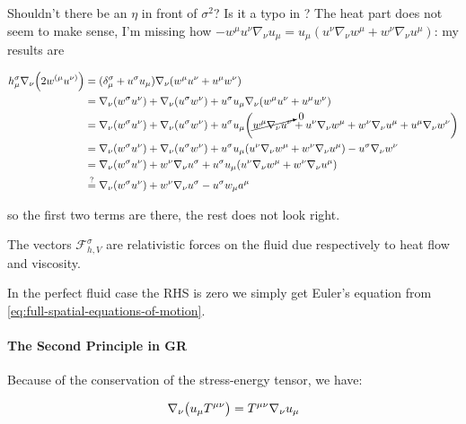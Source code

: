 \documentclass[main.tex]{subfiles}
\begin{document}
\begin{greenbox}
  Shouldn't there be an \(\eta\) in front of \(\sigma^2\)? Is it a typo in \cite[]{Taub:1978}?
  The heat part does not seem to make sense, I'm missing how \(-w^\mu u^\nu \nabla_\nu u_\mu = u_\mu (u^\nu \nabla_\nu w^\mu + w^\nu \nabla_\nu u^\mu)\): my results are

  \begin{subequations}
  \begin{align}
    h^\sigma _\mu \nabla_\nu \qty(2 w^{(\mu} u^{\nu)}) &=  (\delta_\mu ^\sigma + u^\sigma u_\mu) \nabla_\nu \qty(w^\mu u^\nu + u^\mu w^\nu)  \\
    &= \nabla_\nu \qty(w^\sigma u^\nu) + \nabla_\nu (u^\sigma w^\nu)
    + u^\sigma u_\mu \nabla_\nu \qty(w^\mu u^\nu + u^\mu w^\nu)  \\
    &= \nabla_\nu \qty(w^\sigma u^\nu) + \nabla_\nu (u^\sigma w^\nu)
    + u^\sigma u_\mu \qty(\cancelto{0}{ w^\mu \nabla_\nu u^\nu } + u^\nu \nabla_\nu w^\mu + w^\nu \nabla_\nu u^\mu + u^\mu \nabla_\nu w^\nu)  \\
    &= \nabla_\nu \qty(w^\sigma u^\nu) + \nabla_\nu (u^\sigma w^\nu)
    + u^\sigma u_\mu \qty(u^\nu \nabla_\nu w^\mu + w^\nu \nabla_\nu u^\mu) - u^\sigma \nabla_\nu w^\nu  \\
    &= \nabla_\nu \qty(w^\sigma u^\nu) + w^\nu \nabla_\nu u^\sigma
    + u^\sigma u_\mu \qty(u^\nu \nabla_\nu w^\mu + w^\nu \nabla_\nu u^\mu) \\
    &\overset{?}{=} \nabla_\nu \qty(w^\sigma u^\nu) + w^\nu \nabla_\nu u^\sigma
    - u^\sigma w_\mu a^\mu
  \end{align}
  \end{subequations}

  so the first two terms are there, the rest does not look right.
\end{greenbox}

The vectors \(\mathscr F^\sigma _{h, V}\) are relativistic forces on the fluid due respectively to heat flow and viscosity.

In the perfect fluid case the RHS is zero we simply get Euler's equation from \eqref{eq:full-spatial-equations-of-motion}.

\paragraph{The Second Principle in GR}


Because of the conservation of the stress-energy tensor, we have:

\begin{equation} \label{eq:velocity-stress-energy-tensor-identity}
    \nabla_\nu \qty(u_\mu T ^{\mu \nu}) = T^{\mu \nu} \nabla_\nu u_\mu
\end{equation}
\end{document}

